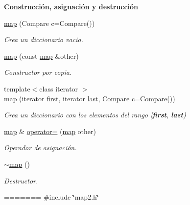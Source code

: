\begin{Indent}{\bf \-Construcción, asignación y destrucción}\par
\begin{DoxyCompactItemize}
\item 
\hyperlink{classaed2_1_1iterator_ab55f7bc4639e905d66935b56995a5b1f_ab55f7bc4639e905d66935b56995a5b1f}{map} (\-Compare c=\-Compare())
\begin{DoxyCompactList}\small\item\em \-Crea un diccionario vacio. \end{DoxyCompactList}\item 
\hyperlink{classaed2_1_1iterator_aee42bcaf809b71168f4266e1d05971e2_aee42bcaf809b71168f4266e1d05971e2}{map} (const \hyperlink{classaed2_1_1map}{map} \&other)
\begin{DoxyCompactList}\small\item\em \-Constructor por copia. \end{DoxyCompactList}\item 
{\footnotesize template$<$class iterator $>$ }\\\hyperlink{classaed2_1_1iterator_aa44ca788a300603c5fae2d192e11f249_aa44ca788a300603c5fae2d192e11f249}{map} (\hyperlink{classaed2_1_1iterator_1_1iterator}{iterator} first, \hyperlink{classaed2_1_1iterator_1_1iterator}{iterator} last, \-Compare c=\-Compare())
\begin{DoxyCompactList}\small\item\em \-Crea un diccionario con los elementos del rango \mbox{[}{\bfseries first}, {\bfseries last}) \end{DoxyCompactList}\item 
\hyperlink{classaed2_1_1map}{map} \& \hyperlink{classaed2_1_1iterator_a7cafd02350b04f7546fa29c17168c18b_a7cafd02350b04f7546fa29c17168c18b}{operator=} (\hyperlink{classaed2_1_1map}{map} other)
\begin{DoxyCompactList}\small\item\em \-Operador de asignación. \end{DoxyCompactList}\item 
\hyperlink{classaed2_1_1iterator_a769d0ae1a1c7ed66acdd321e44fcd0e1_a769d0ae1a1c7ed66acdd321e44fcd0e1}{$\sim$map} ()
\begin{DoxyCompactList}\small\item\em \-Destructor. \end{DoxyCompactList}\end{DoxyCompactItemize}
=======
{\ttfamily \#include \char`\"{}map2.\+h\char`\"{}}


\end{Indent}
